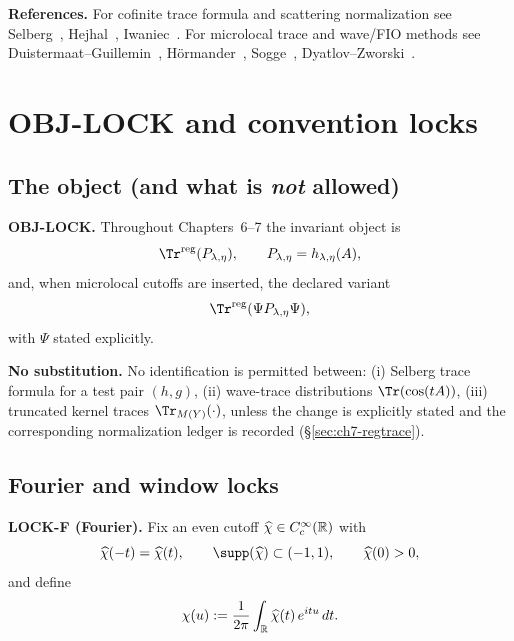 \medskip
\noindent\textbf{References.}
For cofinite trace formula and scattering normalization see Selberg~\cite{Selberg1956},
Hejhal~\cite{Hejhal1983}, Iwaniec~\cite{Iwaniec2002}. For microlocal trace and wave/FIO methods see
Duistermaat--Guillemin~\cite{DuistermaatGuillemin1975}, H\"ormander~\cite{Hormander1983,Hormander1985},
Sogge~\cite{Sogge2014}, Dyatlov--Zworski~\cite{DyatlovZworski2019}.

\section{OBJ-LOCK and convention locks}\label{sec:ch7-objlock}

\subsection{The object (and what is \emph{not} allowed)}\label{subsec:ch7-object}

\noindent\textbf{OBJ-LOCK.}
Throughout Chapters~6--7 the invariant object is
\begin{equation}\label{eq:7.obj}
\Tr^{\mathrm{reg}}(P_{\lambda,\eta}),
\qquad
P_{\lambda,\eta}=h_{\lambda,\eta}(A),
\end{equation}
and, when microlocal cutoffs are inserted, the declared variant
\begin{equation}\label{eq:7.obj.microlocal}
\Tr^{\mathrm{reg}}(\Psi P_{\lambda,\eta}\Psi),
\end{equation}
with $\Psi$ stated explicitly.

\medskip
\noindent\textbf{No substitution.}
No identification is permitted between:
(i) Selberg trace formula for a test pair $(h,g)$,
(ii) wave-trace distributions $\Tr(\cos(tA))$,
(iii) truncated kernel traces $\Tr_{M(Y)}(\cdot)$,
unless the change is explicitly stated and the corresponding normalization ledger is recorded
(\S\ref{sec:ch7-regtrace}).

\subsection{Fourier and window locks}\label{subsec:ch7-locks}

\noindent\textbf{LOCK-F (Fourier).}
Fix an even cutoff $\widehat\chi\in C_c^\infty(\mathbb{R})$ with
\begin{equation}\label{eq:7.chihat.lock}
\widehat\chi(-t)=\widehat\chi(t),\qquad
\supp(\widehat\chi)\subset(-1,1),\qquad
\widehat\chi(0)>0,
\end{equation}
and define
\begin{equation}\label{eq:7.chi.def}
\chi(u):=\frac{1}{2\pi}\int_{\mathbb{R}}\widehat\chi(t)\,e^{itu}\,dt.
\end{equation}

